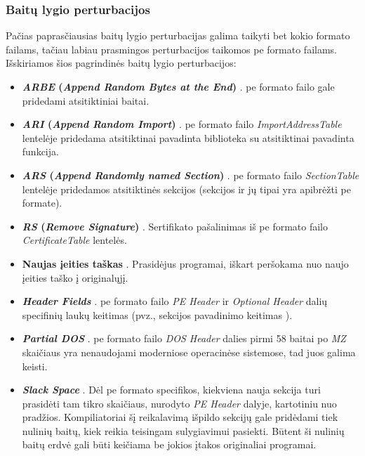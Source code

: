 \subsubsection{Baitų lygio perturbacijos}\label{sec:literature:perturbations:byte}
Pačias paprasčiausias baitų lygio perturbacijas galima taikyti bet kokio formato failams, tačiau labiau prasmingos perturbacijos taikomos \gls{pe} formato failams. Išskiriamos šios pagrindinės baitų lygio perturbacijos:
\begin{itemize}
    \item \textbf{\textit{ARBE} (\textit{Append Random Bytes at the End})} \cite{fangEvadingMalwareEngines2019}. \gls{pe} formato failo gale pridedami atsitiktiniai baitai.
    \item \textbf{\textit{ARI} (\textit{Append Random Import})} \cite{fangEvadingMalwareEngines2019}. \gls{pe} formato failo \textit{ImportAddressTable} lentelėje pridedama atsitiktinai pavadinta biblioteka su atsitiktinai pavadinta funkcija.
    \item \textbf{\textit{ARS} (\textit{Append Randomly named Section})} \cite{fangEvadingMalwareEngines2019}. \gls{pe} formato failo \textit{SectionTable} lentelėje pridedamos atsitiktinės sekcijos (sekcijos ir jų tipai yra apibrėžti \gls{pe} formate).
    \item \textbf{\textit{RS} (\textit{Remove Signature})} \cite{fangEvadingMalwareEngines2019}. Sertifikato pašalinimas iš \gls{pe} formato failo \textit{CertificateTable} lentelės.
    \item \textbf{Naujas įeities taškas} \cite{andersonLearningEvadeStatic2018}. Prasidėjus programai, iškart peršokama nuo naujo įeities taško į originalųjį.
    \item \textbf{\textit{Header Fields}} \cite{demetrioAdversarialEXEmplesSurvey2021}. \gls{pe} formato failo \textit{PE Header} ir \textit{Optional Header} dalių specifinių laukų keitimas (pvz., sekcijos pavadinimo keitimas \cite{andersonLearningEvadeStatic2018}).
    \item \textbf{\textit{Partial DOS}} \cite{demetrioAdversarialEXEmplesSurvey2021}. \gls{pe} formato failo \textit{DOS Header} dalies pirmi 58 baitai po \textit{MZ} skaičiaus yra nenaudojami moderniose operacinėse sistemose, tad juos galima keisti.
    \item \textbf{\textit{Slack Space}} \cite{demetrioAdversarialEXEmplesSurvey2021}. Dėl \gls{pe} formato specifikos, kiekviena nauja sekcija turi prasidėti tam tikro skaičiaus, nurodyto \textit{PE Header} dalyje, kartotiniu nuo pradžios. Kompiliatoriai šį reikalavimą išpildo sekcijų gale pridėdami tiek nulinių baitų, kiek reikia teisingam sulygiavimui pasiekti. Būtent ši nulinių baitų erdvė gali būti keičiama be jokios įtakos originaliai programai.

\end{itemize}
